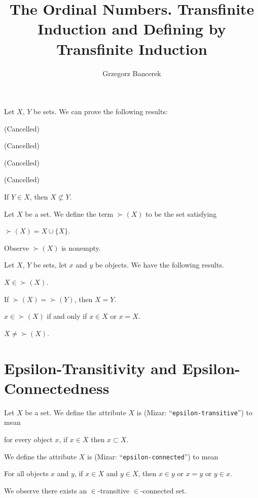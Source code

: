 \documentclass{article}
\title{The Ordinal Numbers. Transfinite Induction and Defining by Transfinite Induction}
\author{Grzegorz Bancerek}
\begin{document}
\maketitle

Let $X$, $Y$ be sets. We can prove the following results:
\begin{thm}
\item\label{ordinal1:1} (Cancelled)
\item\label{ordinal1:2} (Cancelled)
\item\label{ordinal1:3} (Cancelled)
\item\label{ordinal1:4} (Cancelled)
\item\label{ordinal1:5} If $Y\in X$, then $X\nsubset Y$.
\end{thm}

\begin{definition}
Let $X$ be a set. We define the term $\succ(X)$ to be the set satisfying
\begin{defn}
\item $\succ(X)=X\cup\{X\}$.
\end{defn}
\end{definition}

Observe $\succ(X)$ is nonempty.

Let $X$, $Y$ be sets, let $x$ and $y$ be objects.
We have the following results.
\begin{thm}
\item\label{ordinal1:6} $X\in\succ(X)$.
\item\label{ordinal1:7} If $\succ(X)=\succ(Y)$, then $X=Y$.
\item\label{ordinal1:8} $x\in\succ(X)$ if and only if $x\in X$ or $x=X$.
\item\label{ordinal1:9} $X\neq\succ(X)$.
\end{thm}

\section*{Epsilon-Transitivity and Epsilon-Connectedness}

\begin{definition}
Let $X$ be a set.
We define the attribute $X$ is  (Mizar: ``\verb#epsilon-transitive#'')
to mean
\begin{defn}
\item for every object $x$, if $x\in X$ then $x\subset X$.
\end{defn}
We define the attribute $X$ is  (Mizar: ``\verb#epsilon-connected#'')
to mean
\begin{defn}
\item For all objects $x$ and $y$, if $x\in X$ and $y\in X$, then $x\in y$
  or $x=y$ or $y\in x$.
\end{defn}
\end{definition}
We observe there exists an $\in$-transitive $\in$-connected set.
\end{document}
